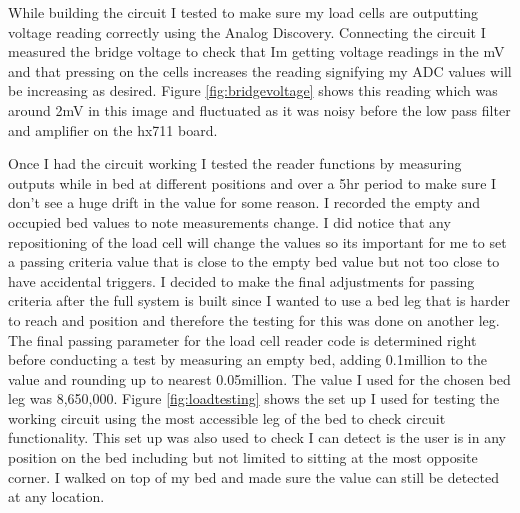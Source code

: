 \documentclass[11pt]{article}
\begin{document}
While building the circuit I tested to make sure my load cells are outputting voltage reading correctly using the Analog Discovery.
Connecting the circuit I measured the bridge voltage to check that Im getting voltage readings in the mV and that pressing on the cells increases the reading signifying my ADC values will be increasing as desired.
Figure \ref{fig:bridgevoltage} shows this reading which was around 2mV in this image and fluctuated as it was noisy before the low pass filter and amplifier on the hx711 board. 

Once I had the circuit working I tested the reader functions by measuring outputs while in bed at different positions and over a 5hr period to make sure I don't see a huge drift in the value for some reason.
I recorded the empty and occupied bed values to note measurements change.
I did notice that any repositioning of the load cell will change the values so its important for me to set a passing criteria value that is close to the empty bed value but not too close to have accidental triggers.
I decided to make the final adjustments for passing criteria after the full system is built since I wanted to use a bed leg that is harder to reach and position and therefore the testing for this was done on another leg.
The final passing parameter for the load cell reader code is determined right before conducting a test by measuring an empty bed, adding 0.1million to the value and rounding up to nearest 0.05million.  
The value I used for the chosen bed leg was 8,650,000.
Figure \ref{fig:loadtesting} shows the set up I used for testing the working circuit using the most accessible leg of the bed to check circuit functionality.
This set up was also used to check I can detect is the user is in any position on the bed including but not limited to sitting at the most opposite corner.
I walked on top of my bed and made sure the value can still be detected at any location.
 
\end{document}
